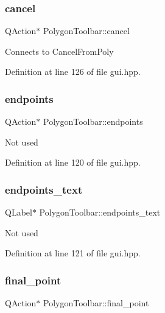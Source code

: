 \subsubsection{\texorpdfstring{cancel}{cancel}}
{\footnotesize\ttfamily Q\+Action$\ast$ Polygon\+Toolbar\+::cancel}

Connects to Cancel\+From\+Poly 

Definition at line 126 of file gui.\+hpp.

\mbox{\label{structPolygonToolbar_a78a569efc30754e02b7d8f5d74ede0ec}} 
\subsubsection{\texorpdfstring{endpoints}{endpoints}}
{\footnotesize\ttfamily Q\+Action$\ast$ Polygon\+Toolbar\+::endpoints}

Not used 

Definition at line 120 of file gui.\+hpp.

\mbox{\label{structPolygonToolbar_a4ab3ad9905d894a2f166a4e1cbfb9e3a}} 
\subsubsection{\texorpdfstring{endpoints\+\_\+text}{endpoints\_text}}
{\footnotesize\ttfamily Q\+Label$\ast$ Polygon\+Toolbar\+::endpoints\+\_\+text}

Not used 

Definition at line 121 of file gui.\+hpp.

\mbox{\label{structPolygonToolbar_a25d471a6081bfa4107d5f1cd9a61d243}} 
\subsubsection{\texorpdfstring{final\+\_\+point}{final\_point}}
{\footnotesize\ttfamily Q\+Action$\ast$ Polygon\+Toolbar\+::final\+\_\+point}

